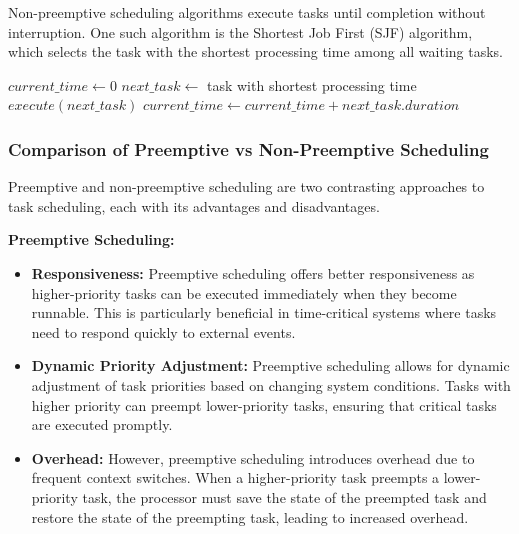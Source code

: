 \documentclass[12pt]{book} %
\begin{document}
Non-preemptive scheduling algorithms execute tasks until completion without interruption. One such algorithm is the Shortest Job First (SJF) algorithm, which selects the task with the shortest processing time among all waiting tasks.
\FloatBarrier
\begin{algorithm}
\caption{Shortest Job First (SJF)}
\begin{algorithmic}[1]
\State $current\_time \gets 0$
\State $next\_task \gets$ task with shortest processing time
\State $execute(next\_task)$
\State $current\_time \gets current\_time + next\_task.duration$
\EndWhile
\EndProcedure
\end{algorithmic}
\end{algorithm}

\subsubsection{Comparison of Preemptive vs Non-Preemptive Scheduling}

Preemptive and non-preemptive scheduling are two contrasting approaches to task scheduling, each with its advantages and disadvantages.

\textbf{Preemptive Scheduling:}
\begin{itemize}
    \item \textbf{Responsiveness:} Preemptive scheduling offers better responsiveness as higher-priority tasks can be executed immediately when they become runnable. This is particularly beneficial in time-critical systems where tasks need to respond quickly to external events.
    \item \textbf{Dynamic Priority Adjustment:} Preemptive scheduling allows for dynamic adjustment of task priorities based on changing system conditions. Tasks with higher priority can preempt lower-priority tasks, ensuring that critical tasks are executed promptly.
    \item \textbf{Overhead:} However, preemptive scheduling introduces overhead due to frequent context switches. When a higher-priority task preempts a lower-priority task, the processor must save the state of the preempted task and restore the state of the preempting task, leading to increased overhead.
\end{itemize}
\end{document}
